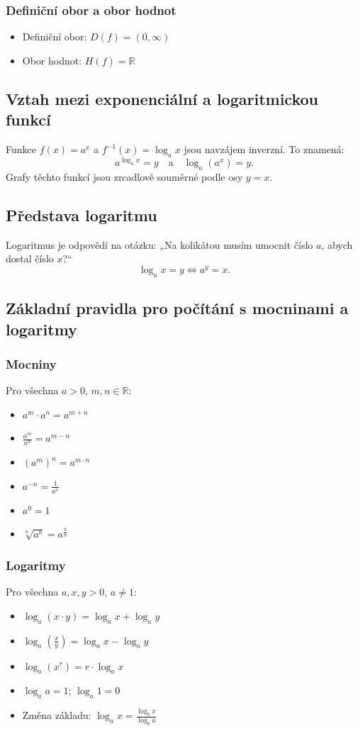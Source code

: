 \subsubsection{Definiční obor a obor hodnot} 
\begin{itemize}
    \item Definiční obor: $D(f) = (0, \infty)$
    \item Obor hodnot: $H(f) = \mathbb{R}$
\end{itemize} 
\subsection{Vztah mezi exponenciální a logaritmickou funkcí}
Funkce $f(x) = a^x$ a $f^{-1}(x) = \log_a x$ jsou navzájem inverzní. To znamená:
$$
a^{\log_a x} = y \quad \text{a} \quad \log_a(a^x) = y.
$$
Grafy těchto funkcí jsou zrcadlově souměrné podle osy $y = x$.

\subsection{Představa logaritmu}
Logaritmus je odpovědí na otázku: „Na kolikátou musím umocnit číslo $a$, abych dostal číslo $x$?“
$$
\log_a x = y \Leftrightarrow a^y = x.
$$
\subsection{Základní pravidla pro počítání s mocninami a logaritmy}
\subsubsection{Mocniny}
Pro všechna $a > 0$, $m, n \in \mathbb{R}$:
\begin{itemize}
    \item $a^m \cdot a^n = a^{m+n}$
    \item $\frac{a^m}{a^n} = a^{m-n}$
    \item $(a^m)^n = a^{m \cdot n}$
    \item $a^{-n} = \frac{1}{a^n}$
    \item $a^0 = 1$
    \item $\sqrt[n]{a^b} = a^{\frac{b}{n}}$
\end{itemize}

\subsubsection{Logaritmy}
Pro všechna $a, x, y > 0$, $a \ne 1$:
\begin{itemize}
    \item $\log_a(x \cdot y) = \log_a x + \log_a y$
    \item $\log_a\left(\frac{x}{y}\right) = \log_a x - \log_a y$
    \item $\log_a(x^r) = r \cdot \log_a x$
    \item $\log_a a = 1$; $\log_a 1 = 0$
    \item Změna základu: $\log_a x = \frac{\log_b x}{\log_b a}$
\end{itemize}
